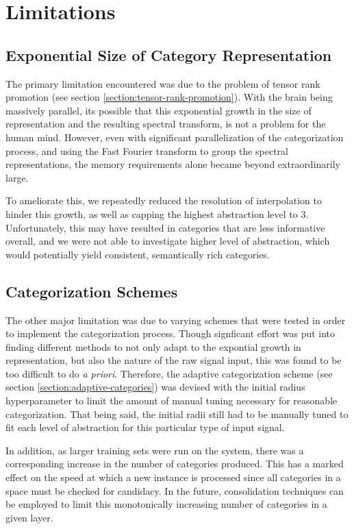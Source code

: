 \section{Limitations}
\label{section:limitations}

\subsection{Exponential Size of Category Representation}
\label{section:exponentil-size-category-represention}

The primary limitation encountered was due to the problem of tensor rank promotion (see section \ref{section:tensor-rank-promotion}).  With the brain being massively parallel, its possible that this exponential growth in the size of representation and the resulting spectral transform, is not a problem for the human mind.  However, even with significant parallelization of the categorization process, and using the Fast Fourier transform \citep{cooley1965algorithm} to group the spectral representations, the memory requirements alone became beyond extraordinarily large.

To ameliorate this, we repeatedly reduced the resolution of interpolation to hinder this growth, as well as capping the highest abstraction level to 3.  Unfortunately, this may have resulted in categories that are less informative overall, and we were not able to investigate higher level of abstraction, which would potentially yield consistent, semantically rich categories.

\subsection{Categorization Schemes}
\label{section:categorization-schemes}

The other major limitation was due to varying schemes that were tested in order to implement the categorization process.  Though signficant effort was put into finding different methods to not only adapt to the expontial growth in representation, but also the nature of the raw signal input, this was found to be too difficult to do \textit{a priori}.  Therefore, the adaptive categorization scheme (see section \ref{section:adaptive-categories}) was devised with the initial radius hyperparameter to limit the amount of manual tuning necessary for reasonable categorization.  That being said, the initial radii still had to be manually tuned to fit each level of abstraction for this particular type of input signal.

In addition, as larger training sets were run on the system, there was a corresponding increase in the number of categories produced.  This has a marked effect on the speed at which a new instance is processed since all categories in a space must be checked for candidacy.  In the future, consolidation techniques \citep{wiggins2019learning} can be employed to limit this monotonically increasing number of categories in a given layer.
